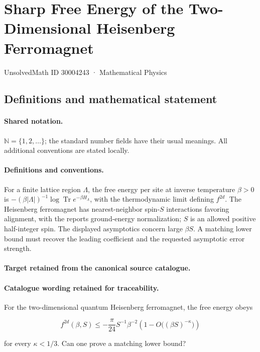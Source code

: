 \documentclass[11pt]{article}
\begin{document}
\setcounter{section}{30004242}
\section{Sharp Free Energy of the Two-Dimensional Heisenberg Ferromagnet}\label{30004243}
{\small UnsolvedMath ID 30004243 · Mathematical Physics}
\subsection{Definitions and mathematical statement}

\paragraph{Shared notation.}$\mathbb N=\{1,2,\ldots\}$; the standard number fields have their usual meanings. All additional conventions are stated locally.


\paragraph{Definitions and conventions.}
For a finite lattice region $\Lambda$, the free energy per site at inverse temperature $\beta>0$ is $-(\beta|\Lambda|)^{-1}\log\operatorname{Tr}e^{-\beta H_\Lambda}$, with the thermodynamic limit defining $f^{2d}$. The Heisenberg ferromagnet has nearest-neighbor spin-$S$ interactions favoring alignment, with the report\textquotesingle s ground-energy normalization; $S$ is an allowed positive half-integer spin. The displayed asymptotics concern large $\beta S$. A matching lower bound must recover the leading coefficient and the requested asymptotic error strength.

\paragraph{Target retained from the canonical source catalogue.}
\paragraph{Catalogue wording retained for traceability.}
For the two-dimensional quantum Heisenberg ferromagnet, the free energy obeys

$$f^{2d}(\beta,S)\leq-\frac\pi{24}S^{-1}\beta^{-2}\left(1-O\bigl((\beta S)^{-\kappa}\bigr)\right)$$

for every $\kappa<1/3$. Can one prove a matching lower bound?
\end{document}
